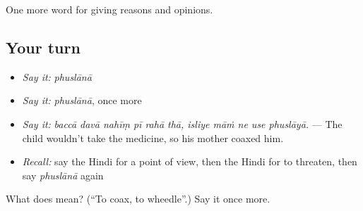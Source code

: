 \begin{grammarlens}[title={What you've built}]
One more word for giving reasons and opinions.
\end{grammarlens}

\subsection*{Your turn}
\begin{itemize}
\raggedright
  \item \emph{Say it:} \emph{phuslānā}
  \item \emph{Say it:} \emph{phuslānā}, once more
  \item \emph{Say it:} \emph{baccā davā nahīṃ pī rahā thā, isliye māṁ ne use phuslāyā.} — The child wouldn't take the medicine, so his mother coaxed him.
  \item \emph{Recall:} say the Hindi for a point of view, then the Hindi for to threaten, then say \emph{phuslānā} again
\end{itemize}

\begin{tcolorbox}[breakable,colback=teal!4,colframe=teal!35!black,title={Before you move on}]
What does  mean? (\textquotedblleft{}To coax, to wheedle\textquotedblright{}.) Say it once more.
\end{tcolorbox}
